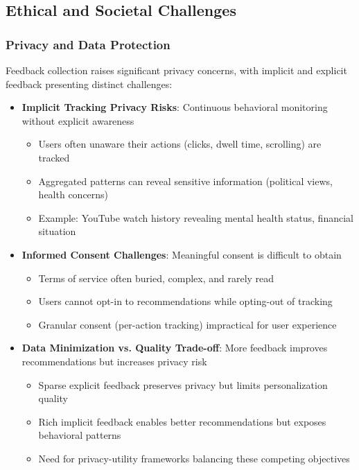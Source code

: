 \subsection{Ethical and Societal Challenges}

\subsubsection{Privacy and Data Protection}

Feedback collection raises significant privacy concerns, with implicit and explicit feedback presenting distinct challenges:

\begin{itemize}
    \item \textbf{Implicit Tracking Privacy Risks}: Continuous behavioral monitoring without explicit awareness
    \begin{itemize}
        \item Users often unaware their actions (clicks, dwell time, scrolling) are tracked
        \item Aggregated patterns can reveal sensitive information (political views, health concerns)
        \item Example: YouTube watch history revealing mental health status, financial situation
    \end{itemize}
    
    \item \textbf{Informed Consent Challenges}: Meaningful consent is difficult to obtain
    \begin{itemize}
        \item Terms of service often buried, complex, and rarely read
        \item Users cannot opt-in to recommendations while opting-out of tracking
        \item Granular consent (per-action tracking) impractical for user experience
    \end{itemize}
    
    \item \textbf{Data Minimization vs. Quality Trade-off}: More feedback improves recommendations but increases privacy risk
    \begin{itemize}
        \item Sparse explicit feedback preserves privacy but limits personalization quality
        \item Rich implicit feedback enables better recommendations but exposes behavioral patterns
        \item Need for privacy-utility frameworks balancing these competing objectives
    \end{itemize}
    

\end{itemize}
